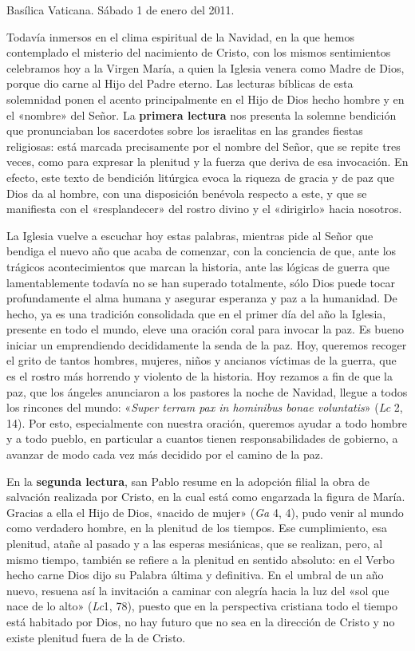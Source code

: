 \documentclass[]{article}
\begin{document}
Basílica Vaticana. Sábado 1 de enero del 2011.

Todavía inmersos en el clima espiritual de la Navidad, en la que hemos
contemplado el misterio del nacimiento de Cristo, con los mismos
sentimientos celebramos hoy a la Virgen María, a quien la Iglesia venera
como Madre de Dios, porque dio carne al Hijo del Padre eterno. Las
lecturas bíblicas de esta solemnidad ponen el acento principalmente en
el Hijo de Dios hecho hombre y en el «nombre» del Señor. La
\textbf{primera lectura} nos presenta la solemne bendición que
pronunciaban los sacerdotes sobre los israelitas en las grandes fiestas
religiosas: está marcada precisamente por el nombre del Señor, que se
repite tres veces, como para expresar la plenitud y la fuerza que deriva
de esa invocación. En efecto, este texto de bendición litúrgica evoca la
riqueza de gracia y de paz que Dios da al hombre, con una disposición
benévola respecto a este, y que se manifiesta con el «resplandecer» del
rostro divino y el «dirigirlo» hacia nosotros.

La Iglesia vuelve a escuchar hoy estas palabras, mientras pide al Señor
que bendiga el nuevo año que acaba de comenzar, con la conciencia de
que, ante los trágicos acontecimientos que marcan la historia, ante las
lógicas de guerra que lamentablemente todavía no se han superado
totalmente, sólo Dios puede tocar profundamente el alma humana y
asegurar esperanza y paz a la humanidad. De hecho, ya es una tradición
consolidada que en el primer día del año la Iglesia, presente en todo el
mundo, eleve una oración coral para invocar la paz. Es bueno iniciar un
emprendiendo decididamente la senda de la paz. Hoy, queremos recoger el
grito de tantos hombres, mujeres, niños y ancianos víctimas de la
guerra, que es el rostro más horrendo y violento de la historia. Hoy
rezamos a fin de que la paz, que los ángeles anunciaron a los pastores
la noche de Navidad, llegue a todos los rincones del mundo: «\emph{Super
terram pax in hominibus bonae voluntatis}» (\emph{Lc} 2, 14). Por esto,
especialmente con nuestra oración, queremos ayudar a todo hombre y a
todo pueblo, en particular a cuantos tienen responsabilidades de
gobierno, a avanzar de modo cada vez más decidido por el camino de la
paz.

En la \textbf{segunda lectura}, san Pablo resume en la adopción filial
la obra de salvación realizada por Cristo, en la cual está como
engarzada la figura de María. Gracias a ella el Hijo de Dios, «nacido de
mujer» (\emph{Ga} 4, 4), pudo venir al mundo como verdadero hombre, en
la plenitud de los tiempos. Ese cumplimiento, esa plenitud, atañe al
pasado y a las esperas mesiánicas, que se realizan, pero, al mismo
tiempo, también se refiere a la plenitud en sentido absoluto: en el
Verbo hecho carne Dios dijo su Palabra última y definitiva. En el umbral
de un año nuevo, resuena así la invitación a caminar con alegría hacia
la luz del «sol que nace de lo alto» (\emph{Lc}1, 78), puesto que en la
perspectiva cristiana todo el tiempo está habitado por Dios, no hay
futuro que no sea en la dirección de Cristo y no existe plenitud fuera
de la de Cristo.
\end{document}
